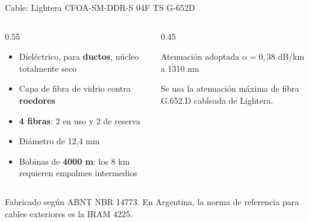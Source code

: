 \begin{frame}{Cable: Lightera CFOA-SM-DDR-S 04F TS G-652D}
  \begin{columns}[T]
    \begin{column}{0.55\textwidth}
      \begin{itemize}
        \item Dieléctrico, para \textbf{ductos}, núcleo totalmente seco
        \item Capa de fibra de vidrio contra \textbf{roedores}
        \item \textbf{4 fibras}: 2 en uso y 2 de reserva
        \item Diámetro de 12,4 mm
        \item Bobinas de \textbf{4000 m}: los 8 km requieren empalmes intermedios
      \end{itemize}
    \end{column}
    \begin{column}{0.45\textwidth}
      \begin{block}{Atenuación adoptada}
        \centering
        $\alpha = 0{,}38$ dB/km a 1310 nm
      \end{block}
      \small
      Se usa la atenuación máxima de fibra G.652.D cableada de Lightera.
    \end{column}
  \end{columns}
  \vspace{0.3cm}
  \small Fabricado según ABNT NBR 14773. En Argentina, la norma de referencia para cables exteriores es la IRAM 4225.
\end{frame}

